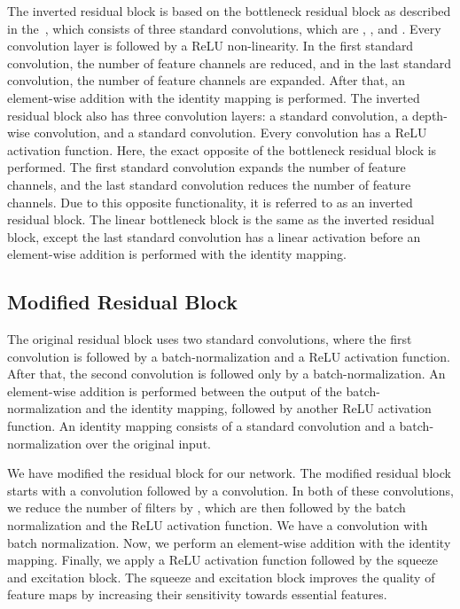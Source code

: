 \documentclass[journal]{IEEEtran}
\begin{document}
The inverted residual block is based on the bottleneck residual block as described in the~\cite{he2016deep}, which consists of three standard convolutions, which are , , and . Every convolution layer is followed by a \ac{ReLU} non-linearity. In the first  standard convolution, the number of feature channels are reduced, and in the last  standard convolution, the number of feature channels are expanded. After that, an element-wise addition with the identity mapping is performed. The inverted residual block also has three convolution layers: a  standard convolution, a  depth-wise convolution, and a  standard convolution. Every convolution has a \ac{ReLU} activation function. Here, the exact opposite of the bottleneck residual block is performed. The first  standard convolution expands the number of feature channels, and the last  standard convolution reduces the number of feature channels. Due to this opposite functionality, it is referred to as an inverted residual block. The linear bottleneck block is the same as the inverted residual block, except the last  standard convolution has a linear activation before an element-wise addition is performed with the identity mapping. 

\subsection{Modified Residual Block}
The original residual block uses two  standard convolutions, where the first convolution is followed by a batch-normalization and a \ac{ReLU} activation function. After that, the second convolution is followed only by a batch-normalization. An element-wise addition is performed between the output of the batch-normalization and the identity mapping, followed by another \ac{ReLU} activation function. An identity mapping consists of a  standard convolution and a batch-normalization over the original input. 

We have modified the residual block for our network. The modified residual block starts with a  convolution followed by a  convolution. In both of these convolutions, we reduce the number of filters by , which are then followed by the batch normalization and the \ac{ReLU} activation function. We have a  convolution with batch normalization.  Now, we perform an element-wise addition with the identity mapping. Finally, we apply a \ac{ReLU} activation function followed by the squeeze and excitation block. The squeeze and excitation block improves the quality of feature maps by increasing their sensitivity towards essential features. 
\end{document}
